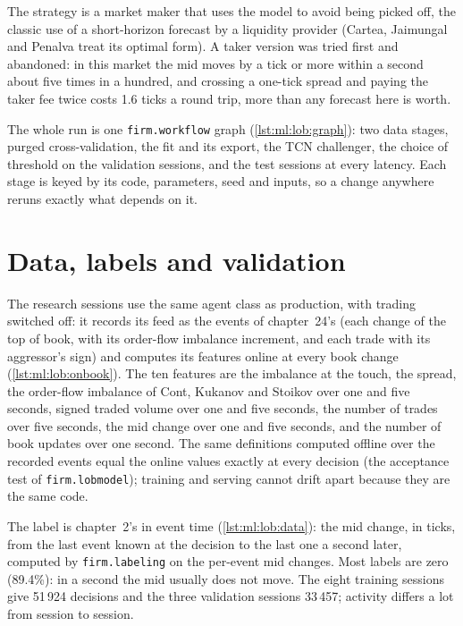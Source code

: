 The strategy is a market maker that uses the model to avoid being picked off, the classic use of a short-horizon forecast by a
liquidity provider (Cartea, Jaimungal and Penalva treat its optimal form). A taker version was tried first and abandoned: in this
market the mid moves by a tick or more within a second about five times in a hundred, and crossing a one-tick spread and paying
the taker fee twice costs 1.6 ticks a round trip, more than any forecast here is worth.

The whole run is one \texttt{firm.workflow} graph (\cref{lst:ml:lob:graph}): two data stages, purged cross-validation, the fit
and its export, the TCN challenger, the choice of threshold on the validation sessions, and the test sessions at every latency.
Each stage is keyed by its code, parameters, seed and inputs, so a change anywhere reruns exactly what depends on it.

\section{Data, labels and validation}

The research sessions use the same agent class as production, with trading switched off: it records its feed as the events of
chapter~24's  (each change of the top of book, with its order-flow imbalance increment, and each trade with its
aggressor's sign) and computes its features online at every book change (\cref{lst:ml:lob:onbook}). The ten features are the
imbalance at the touch, the spread, the order-flow imbalance of Cont, Kukanov and Stoikov over one and five seconds, signed traded
volume over one and five seconds, the number of trades over five seconds, the mid change over one and five seconds, and the number
of book updates over one second. The same definitions computed offline over the recorded events equal the online values exactly
at every decision (the acceptance test of \texttt{firm.lobmodel}); training and serving cannot drift apart because they are the
same code.

The label is chapter~2's  in event time (\cref{lst:ml:lob:data}): the mid change, in ticks, from the last
event known at the decision to the last one a second later, computed by \texttt{firm.labeling} on the per-event mid changes.
Most labels are zero (89.4\%): in a second the mid usually does not move. The eight training sessions give 51\,924 decisions and the
three validation sessions 33\,457; activity differs a lot from session to session.

